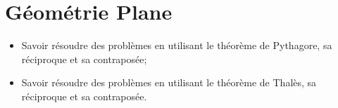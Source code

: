\chapter{Géométrie Plane}\label{ChGeometriePlane}

\begin{acquis}
\begin{itemize}
\item Savoir résoudre des problèmes en utilisant le théorème de Pythagore, sa réciproque et sa contraposée;
\item Savoir résoudre des problèmes en utilisant le théorème de Thalès, sa réciproque et sa contraposée.
\end{itemize}
\end{acquis}

\exercicesbase
\begin{colonne*exercice}

\end{colonne*exercice}

\connaissances
%

\pagebreak




